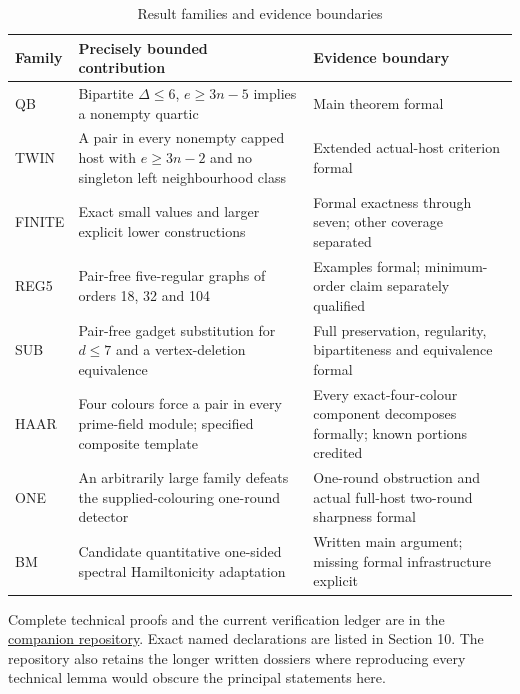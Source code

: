 \documentclass[smallextended]{svjour3}
\newcounter{none} %
\begin{document}
{
\begin{longtable}[]{@{}
  >{\raggedright\arraybackslash}p{}
  >{\raggedright\arraybackslash}p{}
  >{\raggedright\arraybackslash}p{}@{}}
\caption{Result families and evidence boundaries}\label{tab:family-map}\\
\toprule\noalign{}
\begin{minipage}[b]{\linewidth}\raggedright
Family
\end{minipage} & \begin{minipage}[b]{\linewidth}\raggedright
Precisely bounded contribution
\end{minipage} & \begin{minipage}[b]{\linewidth}\raggedright
Evidence boundary
\end{minipage} \\
\midrule\noalign{}
\endhead
\bottomrule\noalign{}
\endlastfoot
QB & Bipartite \(\Delta\leq6\), \(e\geq3n-5\) implies a nonempty quartic
& Main theorem formal \\
TWIN & A pair in every nonempty capped host with \(e\geq3n-2\) and no
singleton left neighbourhood class & Extended actual-host criterion
formal \\
FINITE & Exact small values and larger explicit lower constructions &
Formal exactness through seven; other coverage separated \\
REG5 & Pair-free five-regular graphs of orders 18, 32 and 104 & Examples
formal; minimum-order claim separately qualified \\
SUB & Pair-free gadget substitution for \(d\leq7\) and a vertex-deletion
equivalence & Full preservation, regularity, bipartiteness and
equivalence formal \\
HAAR & Four colours force a pair in every prime-field module; specified
composite template & Every exact-four-colour component decomposes
formally; known portions credited \\
ONE & An arbitrarily large family defeats the supplied-colouring
one-round detector & One-round obstruction and actual full-host
two-round sharpness formal \\
BM & Candidate quantitative one-sided spectral Hamiltonicity adaptation
& Written main argument; missing formal infrastructure explicit \\
\end{longtable}
}

Complete technical proofs and the current verification ledger are in the
\href{https://github.com/alejandrozu/openmath-2026-judging/tree/70c5ec3107658182f22c207d4c50f53f9cb3e602/robert-review-2026-10-07}{companion
repository}. Exact named declarations are listed in Section 10. The
repository also retains the longer written dossiers where reproducing
every technical lemma would obscure the principal statements here.
\end{document}

